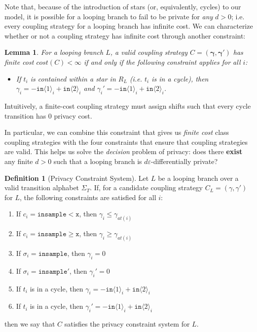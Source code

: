 \documentclass[12pt]{article}
\newcommand{\gguard}[1][x]{\texttt{insample}\geq#1}
\newcommand{\lguard}[1][x]{\texttt{insample} < #1}
\newcommand{\brangle}[1]{\langle#1 \rangle}
\newtheorem{lemma}[thm]{Lemma}
\theoremstyle{definition}
\newtheorem{defn}[thm]{Definition}
\begin{document}
Note that, because of the introduction of stars (or, equivalently, cycles) to our model, it is possible for a looping branch to fail to be private for \textit{any} $d>0$; i.e. every coupling strategy for a looping branch has infinite cost. We can characterize whether or not a coupling strategy has infinite cost through another constraint:

\begin{lemma}\label{finiteCostConstraintLemma}
    For a looping branch $L$, a valid coupling strategy $C = (\mathbf{\gamma}, \mathbf{\gamma}')$ has finite cost $cost(C)<\infty$ if and only if the following constraint applies for all $i$:
    \begin{itemize}
        \item If $t_i$ is contained within a star in $R_L$ (i.e. $t_i$ is in a cycle), then $\gamma_i = -\texttt{in}\brangle{1}_i+\texttt{in}\brangle{2}_i$ and $\gamma_i' = -\texttt{in}\brangle{1}_i+\texttt{in}\brangle{2}_i$.
    \end{itemize}
\end{lemma}

Intuitively, a finite-cost coupling strategy must assign shifts such that every cycle transition has 0 privacy cost. 


In particular, we can combine this constraint that gives us \textit{finite cost} class coupling strategies with the four constraints that ensure that coupling strategies are valid. This helps us solve the \textit{decision} problem of privacy: does there \textbf{exist} any finite $d>0$ such that a looping branch is $d\varepsilon$-differentially private?

\begin{defn}[Privacy Constraint System]\label{privacyConstraintSystem}
    Let $L$ be a looping branch over a valid transition alphabet $\Sigma_T$. If, for a candidate coupling strategy $C_L = (\gamma, \gamma')$ for $L$, the following constraints are satisfied for all $i$: \begin{enumerate}
        \item If $c_i = \lguard[\texttt{x}]$, then $\gamma_i\leq\gamma_{at(i)}$
        \item If $c_i = \gguard[\texttt{x}]$, then $\gamma_i\geq\gamma_{at(i)}$
        \item If $\sigma_i = \texttt{insample}$, then $\gamma_i=0$
        \item If $\sigma_i = \texttt{insample}'$, then $\gamma_i'=0$
        \item If $t_i$ is in a cycle, then $\gamma_i = -\texttt{in}\brangle{1}_i+\texttt{in}\brangle{2}_i$
        \item If $t_i$ is in a cycle, then $\gamma_i' = -\texttt{in}\brangle{1}_i+\texttt{in}\brangle{2}_i$
    \end{enumerate}
    then we say that $C$ satisfies the privacy constraint system for $L$. 
\end{defn}
\end{document}
